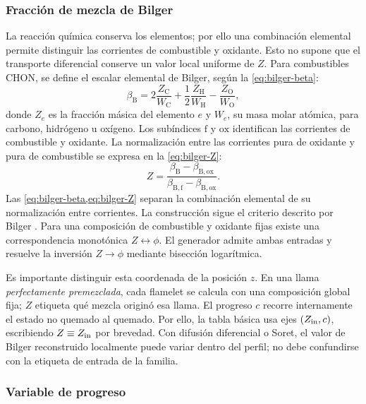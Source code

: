 \documentclass[12pt,a4paper,twoside,openany]{book}
\begin{document}
\subsubsection{Fracción de mezcla de Bilger}

La reacción química conserva los elementos; por ello una combinación elemental
permite distinguir las corrientes de combustible y oxidante. Esto no supone
que el transporte diferencial conserve un valor local uniforme de \(Z\). Para combustibles CHON,
se define el escalar elemental de Bilger, según la \cref{eq:bilger-beta}:
\begin{equation}
  \beta_{\mathrm{B}} = 2\frac{Z_{\mathrm{C}}}{W_{\mathrm{C}}}
  +\frac{1}{2}\frac{Z_{\mathrm{H}}}{W_{\mathrm{H}}}
  -\frac{Z_{\mathrm{O}}}{W_{\mathrm{O}}},
  \label{eq:bilger-beta}
\end{equation}
donde \(Z_e\) es la fracción másica del elemento \(e\) y \(W_e\), su masa
molar atómica, para carbono, hidrógeno u oxígeno. Los subíndices
\(\mathrm f\) y \(\mathrm{ox}\) identifican las corrientes de combustible
y oxidante. La normalización entre las
corrientes pura de oxidante y pura de combustible se expresa en la \cref{eq:bilger-Z}:
\begin{equation}
  Z=\frac{\beta_{\mathrm{B}}-\beta_{\mathrm{B,ox}}}
  {\beta_{\mathrm{B,f}}-\beta_{\mathrm{B,ox}}}.
  \label{eq:bilger-Z}
\end{equation}
Las \cref{eq:bilger-beta,eq:bilger-Z} separan la combinación elemental de su
normalización entre corrientes. La construcción sigue el criterio descrito por Bilger
\cite{Bilger1989}. Para una composición de combustible y oxidante fijas existe
una correspondencia monotónica \(Z\leftrightarrow\phi\). El generador admite
ambas entradas y resuelve la inversión \(Z\to\phi\) mediante bisección
logarítmica.

Es importante distinguir esta coordenada de la posición \(z\). En una llama
\emph{perfectamente premezclada}, cada flamelet se calcula con una composición
global fija; \(Z\) etiqueta qué mezcla originó esa llama. El progreso \(c\)
recorre internamente el estado no quemado al quemado. Por ello, la tabla básica
usa ejes \((Z_{\rm in},c)\), escribiendo \(Z\equiv Z_{\rm in}\) por brevedad.
Con difusión diferencial o Soret, el valor de Bilger reconstruido localmente
puede variar dentro del perfil; no debe confundirse con la etiqueta de entrada
de la familia.

\subsubsection{Variable de progreso}
\end{document}
